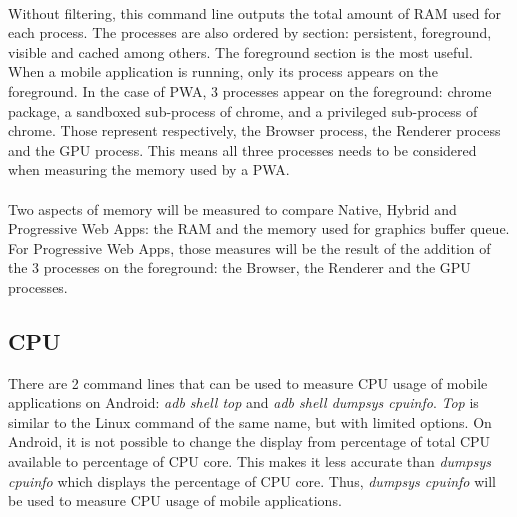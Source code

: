 \documentclass{kththesis}
\begin{document}
\paragraph{}
Without filtering, this command line outputs the total amount of RAM used for each process. The processes are also ordered by section: persistent, foreground, visible and cached among others. \newline
The foreground section is the most useful. When a mobile application is running, only its process appears on the foreground. In the case of PWA, 3 processes appear on the foreground:  chrome package, a sandboxed sub-process of chrome, and a privileged sub-process of chrome. Those represent respectively, the Browser process, the Renderer process and the GPU process. This means all three processes needs to be considered when measuring the memory used by a PWA. 


\paragraph{}
Two aspects of memory will be measured to compare Native, Hybrid and Progressive Web Apps: the RAM and the memory used for graphics buffer queue. For Progressive Web Apps, those measures will be the result of the addition of the 3 processes on the foreground: the Browser, the Renderer and the GPU processes.
    
\subsection{CPU}

There are 2 command lines that can be used to measure CPU usage of mobile applications on Android: \textit{adb shell top} and \textit{adb shell dumpsys cpuinfo}. \textit{Top} is similar to the Linux command of the same name, but with limited options. On Android, it is not possible to change the display from percentage of total CPU available to percentage of CPU core. This makes it less accurate than \textit{dumpsys cpuinfo} which displays the percentage of CPU core. Thus, \textit{dumpsys cpuinfo} will be used to measure CPU usage of mobile applications. 
\end{document}

